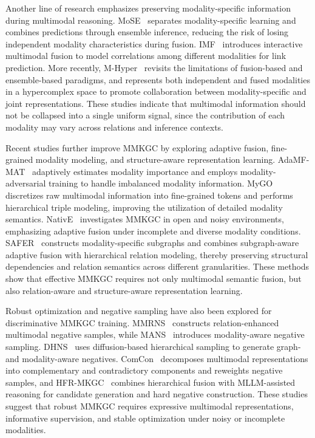 \documentclass[a4paper,fleqn]{cas-sc}
\begin{document}
Another line of research emphasizes preserving modality-specific information during multimodal reasoning. MoSE~\cite{zhao2022mose} separates modality-specific learning and combines predictions through ensemble inference, reducing the risk of losing independent modality characteristics during fusion. IMF~\cite{li2023imf} introduces interactive multimodal fusion to model correlations among different modalities for link prediction. More recently, M-Hyper~\cite{liu2026mhyper} revisits the limitations of fusion-based and ensemble-based paradigms, and represents both independent and fused modalities in a hypercomplex space to promote collaboration between modality-specific and joint representations. These studies indicate that multimodal information should not be collapsed into a single uniform signal, since the contribution of each modality may vary across relations and inference contexts.

Recent studies further improve MMKGC by exploring adaptive fusion, fine-grained modality modeling, and structure-aware representation learning. AdaMF-MAT~\cite{zhang2024adamfmat} adaptively estimates modality importance and employs modality-adversarial training to handle imbalanced modality information. MyGO~\cite{zhang2025mygo} discretizes raw multimodal information into fine-grained tokens and performs hierarchical triple modeling, improving the utilization of detailed modality semantics. NativE~\cite{zhang2024native} investigates MMKGC in open and noisy environments, emphasizing adaptive fusion under incomplete and diverse modality conditions. SAFER~\cite{li2026safer} constructs modality-specific subgraphs and combines subgraph-aware adaptive fusion with hierarchical relation modeling, thereby preserving structural dependencies and relation semantics across different granularities. These methods show that effective MMKGC requires not only multimodal semantic fusion, but also relation-aware and structure-aware representation learning.

Robust optimization and negative sampling have also been explored for discriminative MMKGC training. MMRNS~\cite{xu2022rens} constructs relation-enhanced multimodal negative samples, while MANS~\cite{zhang2023mans} introduces modality-aware negative sampling. DHNS~\cite{niu2025dhns} uses diffusion-based hierarchical sampling to generate graph- and modality-aware negatives. ComCon~\cite{chen2026comcon} decomposes multimodal representations into complementary and contradictory components and reweights negative samples, and HFR-MKGC~\cite{wang2026hfr} combines hierarchical fusion with MLLM-assisted reasoning for candidate generation and hard negative construction. These studies suggest that robust MMKGC requires expressive multimodal representations, informative supervision, and stable optimization under noisy or incomplete modalities.
\end{document}
